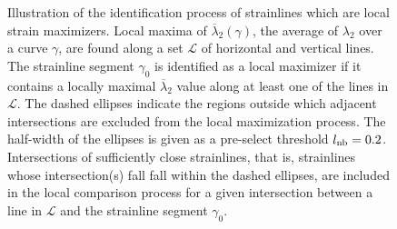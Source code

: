 \begin{figure}[htpb]
    \centering
    \def\svgwidth{0.8\linewidth}
    
    \caption[The identification process of strainlines which
    are local strain maximizers]{Illustration of the identification process of
        strainlines which are local strain maximizers.
        Local maxima of $\overline{\lambda}_{2}(\gamma)$, the average of
        $\lambda_{2}$ over a curve $\gamma$, are found along a set $\mathcal{L}$
        of horizontal and vertical lines. The strainline segment
    $\gamma_{0}$ is identified as a local maximizer if it contains a locally
maximal $\overline{\lambda}_{2}$ value along at least one of the lines in
$\mathcal{L}$. The dashed ellipses indicate the regions outside which
adjacent intersections are excluded from the local maximization process.
The half-width of the ellipses is given as a pre-select threshold
$l_{\textnormal{nb}}=0.2$. Intersections of sufficiently close strainlines,
that is, strainlines whose intersection(s) fall fall within the dashed
ellipses, are included in the local comparison process for a given intersection
between a line in $\mathcal{L}$ and the strainline segment $\gamma_{0}$.}
    \label{fig:neighborlcs}
\end{figure}
